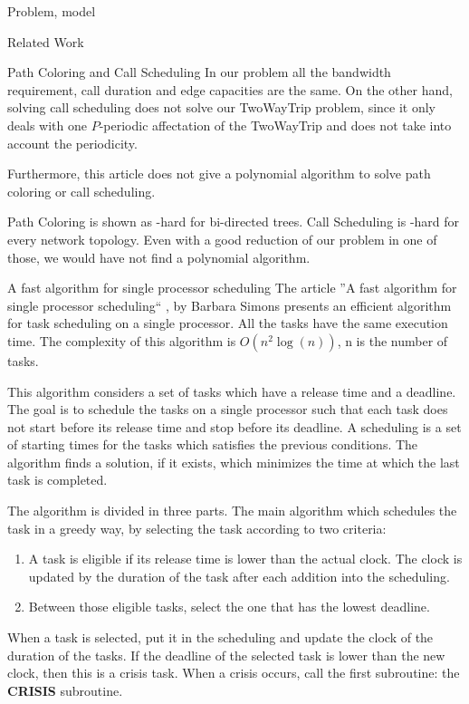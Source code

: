 \documentclass[a4paper,10pt]{report}
\begin{document}
\begin{chapter}{Problem, model}
\begin{section}{Related Work}
\begin{subsection}{Path Coloring and Call Scheduling}
In our problem all the bandwidth requirement, call duration and edge capacities are the same.
On the other hand, solving call scheduling does not solve our TwoWayTrip problem, since it only deals with one $P$-periodic affectation of the TwoWayTrip and does not take into account the periodicity.

Furthermore, this article does not give a polynomial algorithm to solve path coloring or call scheduling. 

Path Coloring is shown as \NP-hard for bi-directed trees. Call Scheduling is \NP-hard for every network topology. Even with a good reduction of our problem in one of those, we would have not find a polynomial algorithm.


\end{subsection}

\begin{subsection}{A fast algorithm for single processor scheduling}
The article ''A fast algorithm for single processor scheduling`` \cite{simons1978fast}, by Barbara Simons presents an efficient algorithm for task 
scheduling on a single processor. All the tasks have the same execution time. The complexity of this algorithm is $O(n^2\log(n))$, n is the number of tasks.

This algorithm considers a set of tasks which have a release time and a deadline. The goal is to schedule the tasks on a single processor such
that each task does not start before its release time and stop before its deadline.
A scheduling is a set of starting times for the tasks which satisfies the previous conditions.
The algorithm finds a solution, if it exists, which minimizes the time at which the last task is completed.

The algorithm is divided in three parts.
The main algorithm which schedules the task in a greedy way, by selecting the task according to two criteria:
\begin{enumerate}
 \item A task is eligible if its release time is lower than the actual clock. The clock is updated by the duration of the task after each addition into the scheduling.
 \item Between those eligible tasks, select the one that has the lowest deadline.
\end{enumerate}

When a task is selected, put it in the scheduling and update the clock of the duration of the tasks.
If the deadline of the selected task is lower than the new clock, then this is a crisis task.
When a crisis occurs, call the first subroutine: the {\bf CRISIS} subroutine.


\end{subsection}
\end{section}
\end{chapter}
\end{document}
